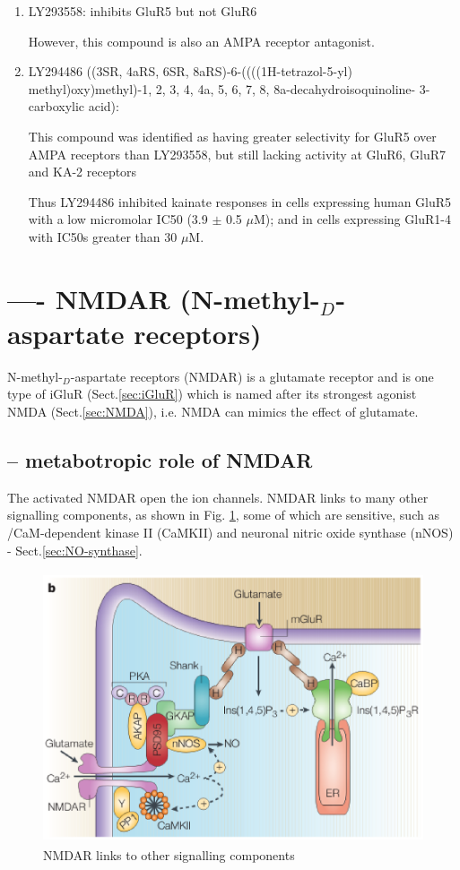 \begin{enumerate}

  \item LY293558: inhibits GluR5 but not GluR6
  
 However, this compound is also an AMPA receptor antagonist.
 
  \item  LY294486 ((3SR, 4aRS, 6SR, 8aRS)-6-((((1H-tetrazol-5-yl)
  methyl)oxy)methyl)-1, 2, 3, 4, 4a, 5, 6, 7, 8, 8a-decahydroisoquinoline-
  3-carboxylic acid):

This compound was identified as having greater selectivity for GluR5 over AMPA
receptors than LY293558, but still lacking activity at GluR6, GluR7 and KA-2 receptors 

Thus LY294486 inhibited kainate responses in cells expressing human GluR5 with a
low micromolar IC50 (3.9 $\pm$ 0.5 $\mu$M); and in cells expressing GluR1-4 with
IC50s greater than 30 $\mu$M.


\end{enumerate}

\section{---- NMDAR (N-methyl-$_D$-aspartate receptors)}
\label{sec:NMDAR}

N-methyl-$_D$-aspartate receptors (NMDAR) is a glutamate receptor and is one
type of iGluR (Sect.\ref{sec:iGluR}) which is named after its strongest agonist
NMDA (Sect.\ref{sec:NMDA}), i.e. NMDA can mimics the effect of glutamate.

\subsection{-- metabotropic role of NMDAR}
\label{sec:NMDAR-metabotropic-role}

The activated NMDAR open the ion channels. NMDAR links to many other signalling
components, as shown in Fig. \ref{fig:NMDAR_complex}, some of which are
 sensitive, such as /CaM-dependent kinase II (CaMKII) and
neuronal nitric oxide synthase (nNOS) - Sect.\ref{sec:NO-synthase}.

\begin{figure}[htb]
  \centerline{\includegraphics[height=8cm]{./images/NMDAR_complex.eps}}
  \caption{NMDAR links to other signalling components}\label{fig:NMDAR_complex}
\end{figure}

